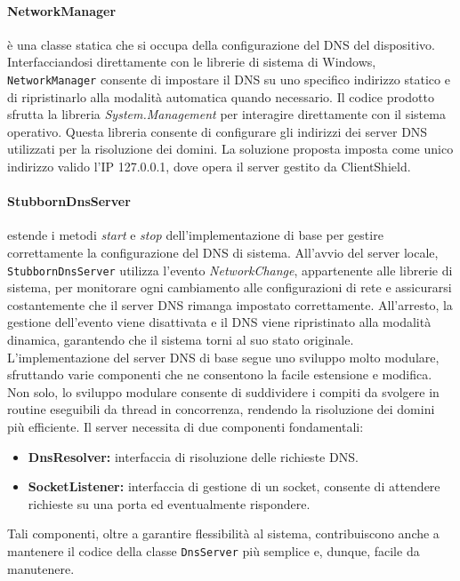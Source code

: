 \documentclass[12pt,a4paper,openright,twoside]{book}
\newcommand{\itemdef}[1]{\item \textbf{#1}}
\newcommand{\class}[1]{\texttt{#1}}
\begin{document}
\paragraph{NetworkManager} è una classe statica che si occupa della configurazione del \gls{DNS} del dispositivo.
Interfacciandosi direttamente con le librerie di sistema di Windows, \class{NetworkManager} consente di impostare il \gls{DNS} su uno specifico indirizzo statico e di ripristinarlo alla modalità automatica quando necessario.
Il codice prodotto sfrutta la libreria \textit{System.Management} per interagire direttamente con il sistema operativo.
Questa libreria consente di configurare gli indirizzi dei server \gls{DNS} utilizzati per la risoluzione dei domini.
La soluzione proposta imposta come unico indirizzo valido l'IP 127.0.0.1, dove opera il server gestito da ClientShield.

\paragraph{StubbornDnsServer} estende i metodi \textit{start} e \textit{stop} dell'implementazione di base per gestire correttamente la configurazione del \gls{DNS} di sistema.
All'avvio del server locale, \class{StubbornDnsServer} utilizza l'evento \textit{NetworkChange}, appartenente alle librerie di sistema, per monitorare ogni cambiamento alle configurazioni di rete e assicurarsi costantemente che il server \gls{DNS} rimanga impostato correttamente.
All'arresto, la gestione dell'evento viene disattivata e il \gls{DNS} viene ripristinato alla modalità dinamica, garantendo che il sistema torni al suo stato originale.\\

L'implementazione del server \gls{DNS} di base segue uno sviluppo molto modulare, sfruttando varie componenti che ne consentono la facile estensione e modifica.
Non solo, lo sviluppo modulare consente di suddividere i compiti da svolgere in routine eseguibili da thread in concorrenza, rendendo la risoluzione dei domini più efficiente.
Il server necessita di due componenti fondamentali:
\begin{itemize}
	\itemdef{DnsResolver:} interfaccia di risoluzione delle richieste \gls{DNS}.
	\itemdef{SocketListener:} interfaccia di gestione di un socket, consente di attendere richieste su una porta ed eventualmente rispondere.
\end{itemize}
Tali componenti, oltre a garantire flessibilità al sistema, contribuiscono anche a mantenere il codice della classe \class{DnsServer} più semplice e, dunque, facile da manutenere.
\end{document}
